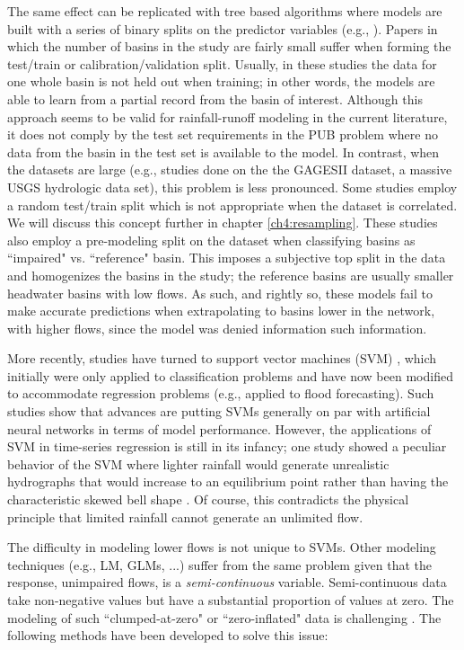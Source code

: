 The same effect can be replicated with tree based algorithms where models are built with a series of binary splits on the predictor variables (e.g., ). Papers in which the number of basins in the study are fairly small suffer when forming the test/train or calibration/validation split. Usually, in these studies the data for one whole basin is not held out when training; in other words, the models are able to learn from a partial record from the basin of interest. Although this approach seems to be valid for rainfall-runoff modeling in the current literature, it does not comply by the test set requirements in the PUB problem where no data from the basin in the test set is available to the model. In contrast, when the datasets are large (e.g., studies done on the the GAGESII dataset, a massive USGS hydrologic data set), this problem is less pronounced. Some studies employ a random test/train split which is not appropriate when the dataset is correlated. We will discuss this concept further in chapter \ref{ch4:resampling}. These studies also employ a pre-modeling split on the dataset when classifying basins as ``impaired" vs. ``reference" basin. This imposes a subjective top split in the data and homogenizes the basins in the study; the reference basins are usually smaller headwater basins with low flows. As such, and rightly so, these models fail to make accurate predictions when extrapolating to basins lower in the network, with higher flows, since the model was denied information such information.  

More recently, studies have turned to support vector machines (SVM) \cite{asefa2006multi, lin2006using}, which initially were only applied to classification problems and have now been modified to accommodate regression problems (e.g.,  applied to flood forecasting). Such studies show that advances are putting SVMs generally on par with artificial neural networks in terms of model performance. However, the applications of SVM in time-series regression is still in its infancy; one study showed a peculiar behavior of the SVM where lighter rainfall would generate unrealistic hydrographs that would increase to an equilibrium point rather than having the characteristic skewed bell shape \cite{han2007flood}. Of course, this contradicts the physical principle that limited rainfall cannot generate an unlimited flow.

The difficulty in modeling lower flows is not unique to SVMs. Other modeling techniques (e.g., LM, GLMs, ...) suffer from the same problem given that the response, unimpaired flows, is a \textit{semi-continuous} variable. Semi-continuous data take non-negative values but have a substantial proportion of values at zero. The modeling of such ``clumped-at-zero" or ``zero-inflated"  data is challenging \cite{min2002modeling}. The following methods have been developed to solve this issue: 

